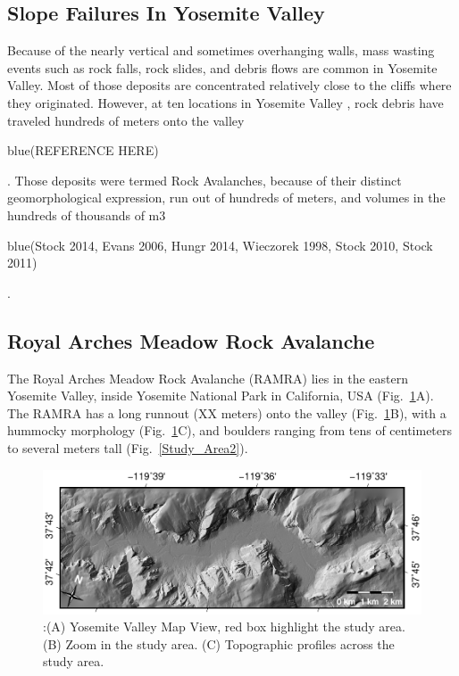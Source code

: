 \documentclass[5p]{elsarticle}
\newcommand{\COMON}{\begin{color}{blue}}
\newcommand{\COMOFF}{\end{color}}
\begin{document}
    
    
\subsection{Slope Failures In Yosemite Valley}

Because of  the nearly vertical and sometimes overhanging walls, mass wasting events such as rock falls, rock slides, and debris flows are common in Yosemite Valley. Most of those deposits are concentrated relatively close to the cliffs where they originated. However, at ten locations in Yosemite Valley , rock debris have traveled hundreds of meters onto the valley \COMON(REFERENCE HERE)\COMOFF. Those deposits were termed Rock Avalanches, because of their distinct geomorphological expression, run out of hundreds of meters, and volumes in the hundreds of thousands of m3 \COMON(Stock 2014, Evans 2006,  Hungr 2014, Wieczorek 1998, Stock 2010, Stock 2011)\COMOFF. 
\bigskip


   
\subsection{Royal Arches Meadow Rock Avalanche}\label{sec:introRAMRA}

The Royal Arches Meadow Rock Avalanche (RAMRA) lies in the eastern Yosemite Valley, inside Yosemite National Park in California, USA (Fig.~\ref{Study_Area}A). The RAMRA has a long runnout (XX meters) onto the valley (Fig.~\ref{Study_Area}B), with a hummocky morphology (Fig.~\ref{Study_Area}C), and boulders ranging from tens of centimeters to several meters tall (Fig.~\ref{Study_Area2}).


								   \begin{figure}[h]

	\includegraphics[width=\textwidth]{Yosemite.pdf}
		\caption{:(A) Yosemite Valley Map View, red box highlight the study area. (B) Zoom in the study area. (C) Topographic profiles across the study area.  \label{Study_Area}}

								   \end{figure}
\end{document}
